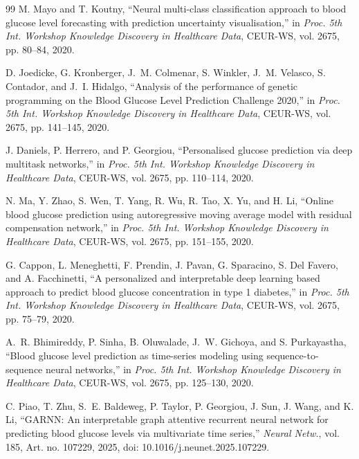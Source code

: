 \documentclass[journal]{IEEEtran}
\begin{document}
\begin{thebibliography}{99}
 M. Mayo and T. Koutny, ``Neural multi-class classification approach to blood glucose level forecasting with prediction uncertainty visualisation,'' in \emph{Proc. 5th Int. Workshop Knowledge Discovery in Healthcare Data}, CEUR-WS, vol. 2675, pp. 80--84, 2020.

 D. Joedicke, G. Kronberger, J.~M. Colmenar, S. Winkler, J.~M. Velasco, S. Contador, and J.~I. Hidalgo, ``Analysis of the performance of genetic programming on the Blood Glucose Level Prediction Challenge 2020,'' in \emph{Proc. 5th Int. Workshop Knowledge Discovery in Healthcare Data}, CEUR-WS, vol. 2675, pp. 141--145, 2020.

 J. Daniels, P. Herrero, and P. Georgiou, ``Personalised glucose prediction via deep multitask networks,'' in \emph{Proc. 5th Int. Workshop Knowledge Discovery in Healthcare Data}, CEUR-WS, vol. 2675, pp. 110--114, 2020.

 N. Ma, Y. Zhao, S. Wen, T. Yang, R. Wu, R. Tao, X. Yu, and H. Li, ``Online blood glucose prediction using autoregressive moving average model with residual compensation network,'' in \emph{Proc. 5th Int. Workshop Knowledge Discovery in Healthcare Data}, CEUR-WS, vol. 2675, pp. 151--155, 2020.

 G. Cappon, L. Meneghetti, F. Prendin, J. Pavan, G. Sparacino, S. Del Favero, and A. Facchinetti, ``A personalized and interpretable deep learning based approach to predict blood glucose concentration in type 1 diabetes,'' in \emph{Proc. 5th Int. Workshop Knowledge Discovery in Healthcare Data}, CEUR-WS, vol. 2675, pp. 75--79, 2020.

 A.~R. Bhimireddy, P. Sinha, B. Oluwalade, J.~W. Gichoya, and S. Purkayastha, ``Blood glucose level prediction as time-series modeling using sequence-to-sequence neural networks,'' in \emph{Proc. 5th Int. Workshop Knowledge Discovery in Healthcare Data}, CEUR-WS, vol. 2675, pp. 125--130, 2020.

 C. Piao, T. Zhu, S.~E. Baldeweg, P. Taylor, P. Georgiou, J. Sun, J. Wang, and K. Li, ``GARNN: An interpretable graph attentive recurrent neural network for predicting blood glucose levels via multivariate time series,'' \emph{Neural Netw.}, vol. 185, Art. no. 107229, 2025, doi: 10.1016/j.neunet.2025.107229.


\end{thebibliography}
\end{document}

